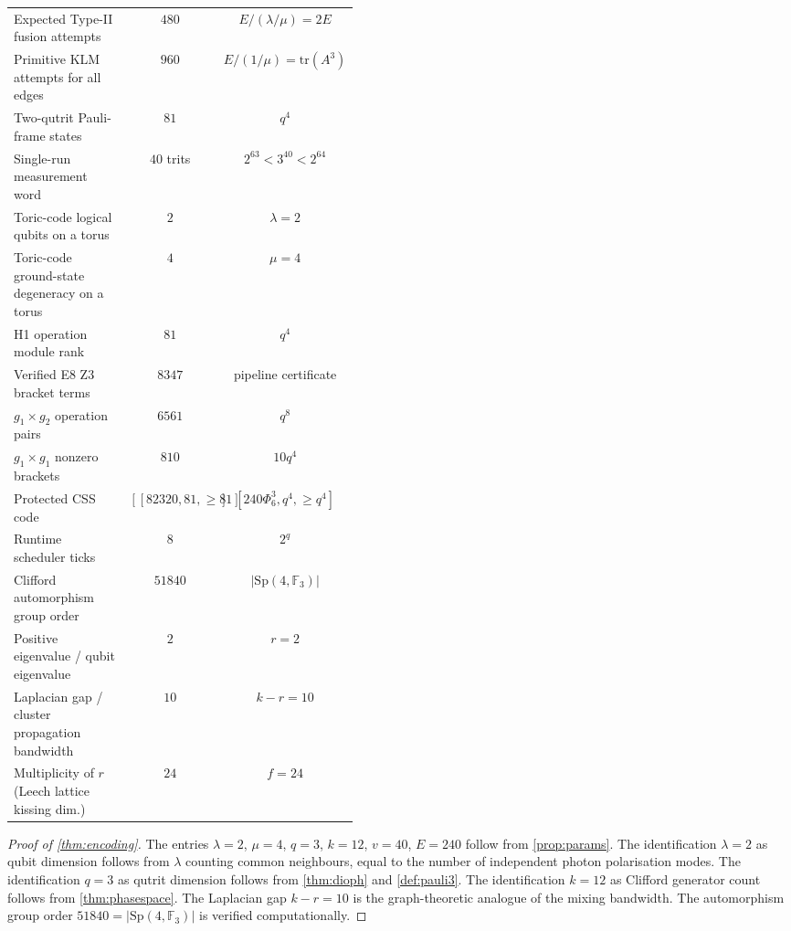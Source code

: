 ﻿\documentclass[12pt]{article}
\newcommand{\FF}{\mathbb{F}}
\newcommand{\Sp}{\mathrm{Sp}}
\begin{document}
\begin{center}
\begin{tabular}{@{}p{0.44\linewidth}cc@{}}
Expected Type-II fusion attempts                   & $480$   & $E/(\lambda/\mu)=2E$ \\
Primitive KLM attempts for all edges               & $960$   & $E/(1/\mu)=\mathrm{tr}(A^3)$ \\
Two-qutrit Pauli-frame states                      & $81$    & $q^4$ \\
Single-run measurement word                        & $40$ trits & $2^{63}<3^{40}<2^{64}$ \\
Toric-code logical qubits on a torus               & $2$     & $\lambda = 2$ \\
Toric-code ground-state degeneracy on a torus      & $4$     & $\mu = 4$ \\
H1 operation module rank                           & $81$    & $q^4$ \\
Verified E8 Z3 bracket terms                       & $8347$  & pipeline certificate \\
$g_1\times g_2$ operation pairs                    & $6561$  & $q^8$ \\
$g_1\times g_1$ nonzero brackets                  & $810$   & $10q^4$ \\
Protected CSS code                                 & $[[82320,81,\ge81]]$ & $[240\Phi_6^3, q^4, \ge q^4]$ \\
Runtime scheduler ticks                            & $8$     & $2^q$ \\
Clifford automorphism group order                  & $51840$ & $|\Sp(4,\FF_3)|$ \\
Positive eigenvalue / qubit eigenvalue             & $2$     & $r = 2$ \\
Laplacian gap / cluster propagation bandwidth      & $10$    & $k - r = 10$ \\
Multiplicity of $r$ (Leech lattice kissing dim.)   & $24$    & $f = 24$ \\
\bottomrule
\end{tabular}
\end{center}

\begin{proof}[Proof of \cref{thm:encoding}]
The entries $\lambda=2$, $\mu=4$, $q=3$, $k=12$, $v=40$, $E=240$ follow from
\cref{prop:params}.  The identification $\lambda=2$ as qubit dimension follows from
$\lambda$ counting common neighbours, equal to the number of independent photon
polarisation modes.  The identification $q=3$ as qutrit dimension follows from
\cref{thm:dioph} and \cref{def:pauli3}.  The identification $k=12$ as Clifford
generator count follows from \cref{thm:phasespace}.  The Laplacian gap $k-r=10$ is
the graph-theoretic analogue of the mixing bandwidth.  The automorphism group order
$51840 = |\Sp(4,\FF_3)|$ is verified computationally.
\end{proof}
\end{document}
